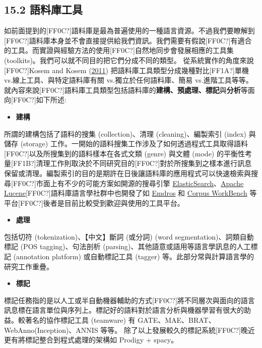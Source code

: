 \subsection{15.2 語料庫工具}

如前面提到的[FF0C?]語料庫是最為普遍使用的一種語言資源。不過我們要瞭解到[FF0C?]語料庫本身並不會直接提供給我們資訊。我們需要有假說[FF0C?]有適合的工具。而實證與經驗方法的使用[FF0C?]自然地同步會發展相應的工具集 (toolkits)。我們可以就不同目的把它們分成不同的類型。 從系統實作的角度來說[FF0C?]Kosem and Kosem (\hyperlink{bookmarkid19c6y18}{2011}) 把語料庫工具類型分成幾種對比[FF1A?]單機 vs.線上工具、與特定語料庫有關 vs.獨立於任何語料庫、簡易 vs.進階工具等等。就內容來說[FF0C?]語料庫工具類型包括語料庫的\textbf{建構、預處理、標記}與\textbf{分析}等面向[FF0C?]如下所述:

\begin{itemize}
\item \textbf{建構}

\end{itemize}

所謂的建構包括了語料的搜集 (collection)、清理 (cleaning)、編製索引 (index) 與儲存 (storage) 工作。一開始的語料搜集工作涉及了如何透過程式工具取得語料[FF0C?]以及所搜集到的語料樣本在各式文類 (genre) 與文體 (mode) 的平衡性考量[FF1B?]清理工作則取決於不同研究目的[FF0C?]對於所搜集到之樣本進行訊息保留或清理。編製索引的目的是期許在日後讓語料庫的應用程式可以快速檢索與搜尋[FF0C?]市面上有不少的可能方案如開源的搜尋引擎 \href{https://www.elastic.co}{ElasticSearch}、\href{https://lucene.apache.org}{Apache Lucene}[FF0C?]語料庫語言學社群中也開發了如 \href{http://emdros.org}{Emdros} 和 \href{http://cwb.sourceforge.net}{Corpus WorkBench} 等平台[FF0C?]後者是目前比較受到歡迎與使用的工具平台。

\begin{itemize}
\item \textbf{處理}

\end{itemize}

包括切符 (tokenization)、【中文】斷詞 (或分詞) (word segmentation)、詞類自動標記 (POS tagging)、句法剖析 (parsing)、其他語意或語用等語言學訊息的人工標記 (annotation platform) 或自動標記工具 (tagger) 等。此部分常與計算語言學的研究工作重疊。

\begin{itemize}
\item \textbf{標記}

\end{itemize}

標記任務指的是以人工或半自動機器輔助的方式[FF0C?]將不同層次與面向的語言訊息標在語言單位與序列上。標記好的語料對於語言分析與機器學習有很大的助益。較著名的協作標記工具 (teamware) 有 GATE、MAE、BRAT、WebAnno(Inception)、ANNIS 等等。 除了以上發展較久的標記系統[FF0C?]晚近更有將標記整合到程式處理的架構如 Prodigy + spacy。

